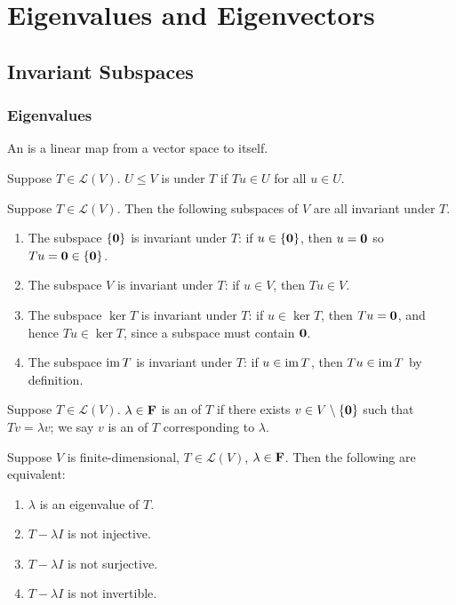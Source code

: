 \chapter{Eigenvalues and Eigenvectors}\label{chap:eigenvalues-eigenvectors}
\section{Invariant Subspaces}
\subsection{Eigenvalues}
\begin{definition}[Operator]
An  is a linear map from a vector space to itself.
\end{definition}

\begin{definition}
Suppose $T\in\mathcal{L}(V)$. $U\le V$ is  under $T$ if $Tu\in U$ for all $u\in U$.
\end{definition}

\begin{example}
Suppose $T\in\mathcal{L}(V)$. Then the following subspaces of $V$ are all invariant under $T$.
\begin{enumerate}[label=(\roman*)]
\item The subspace $\{\vb{0}\}$ is invariant under $T$: if $u\in\{\vb{0}\}$, then $u=\vb{0}$ so $Tu=\vb{0}\in\{\vb{0}\}$.
\item The subspace $V$ is invariant under $T$: if $u\in V$, then $Tu\in V$. 
\item The subspace $\ker T$ is invariant under $T$: if $u\in\ker T$, then $Tu=\vb{0}$, and hence $Tu\in\ker T$, since a subspace must contain $\vb{0}$.
\item The subspace $\operatorname{im} T$ is invariant under $T$: if $u\in\operatorname{im} T$, then $Tu\in\operatorname{im} T$ by definition.
\end{enumerate}
\end{example}

\begin{definition}
Suppose $T\in\mathcal{L}(V)$. $\lambda\in\mathbf F$ is an  of $T$ if there exists $v\in V\setminus\{\vb{0}\}$ such that $Tv=\lambda v$; we say $v$ is an  of $T$ corresponding to $\lambda$.
\end{definition}

\begin{lemma}\label{lemma:eigenvalue-equivalent-conditions}
Suppose $V$ is finite-dimensional, $T\in\mathcal{L}(V)$, $\lambda\in\mathbf F$. Then the following are equivalent:
\begin{enumerate}[label=(\roman*)]
\item $\lambda$ is an eigenvalue of $T$.
\item $T-\lambda I$ is not injective.
\item $T-\lambda I$ is not surjective.
\item $T-\lambda I$ is not invertible.
\end{enumerate}
\end{lemma}

